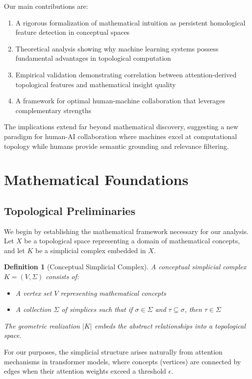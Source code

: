 \documentclass[11pt]{article}
\newtheorem{definition}[theorem]{Definition}
\begin{document}
Our main contributions are:

\begin{enumerate}
\item A rigorous formalization of mathematical intuition as persistent homological feature detection in conceptual spaces
\item Theoretical analysis showing why machine learning systems possess fundamental advantages in topological computation
\item Empirical validation demonstrating correlation between attention-derived topological features and mathematical insight quality
\item A framework for optimal human-machine collaboration that leverages complementary strengths
\end{enumerate}

The implications extend far beyond mathematical discovery, suggesting a new paradigm for human-AI collaboration where machines excel at computational topology while humans provide semantic grounding and relevance filtering.

\section{Mathematical Foundations}

\subsection{Topological Preliminaries}

We begin by establishing the mathematical framework necessary for our analysis. Let $X$ be a topological space representing a domain of mathematical concepts, and let $K$ be a simplicial complex embedded in $X$.

\begin{definition}[Conceptual Simplicial Complex]
A conceptual simplicial complex $K = (V, \Sigma)$ consists of:
\begin{itemize}
\item A vertex set $V$ representing mathematical concepts
\item A collection $\Sigma$ of simplices such that if $\sigma \in \Sigma$ and $\tau \subseteq \sigma$, then $\tau \in \Sigma$
\end{itemize}
The geometric realization $|K|$ embeds the abstract relationships into a topological space.
\end{definition}

For our purposes, the simplicial structure arises naturally from attention mechanisms in transformer models, where concepts (vertices) are connected by edges when their attention weights exceed a threshold $\epsilon$.
\end{document}
